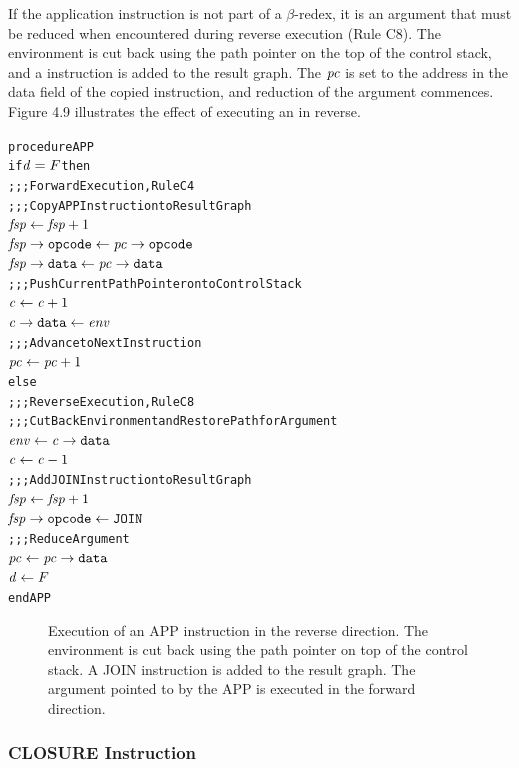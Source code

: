If the application instruction is not part of a \(\beta\)-redex, it is an argument that must be reduced when encountered during reverse execution (Rule C8). The environment is cut back using the path pointer on the top of the control stack, and a  instruction is added to the result graph. The \(\mathit{pc}\) is set to the address in the data field of the copied  instruction, and reduction of the argument commences. Figure 4.9 illustrates the effect of executing an  in reverse.

\par\smallskip\noindent\begin{minipage}{\linewidth}
\begin{alltt}
procedure APP
  if \(\rt{d} = F\) then
    \textrm{;;; Forward Execution, Rule C4}
    \textrm{;;; Copy APP Instruction to Result Graph}
    \(\rt{fsp} \leftarrow \rt{fsp}+1\)
    \(\rtfield{fsp}{opcode} \leftarrow \rtfield{pc}{opcode}\)
    \(\rtfield{fsp}{data} \leftarrow \rtfield{pc}{data}\)
    \textrm{;;; Push Current Path Pointer onto Control Stack}
    \(\rt{c} \leftarrow \rt{c}+1\)
    \(\rtfield{c}{data} \leftarrow \rt{env}\)
    \textrm{;;; Advance to Next Instruction}
    \(\rt{pc} \leftarrow \rt{pc}+1\)
  else
    \textrm{;;; Reverse Execution, Rule C8}
    \textrm{;;; Cut Back Environment and Restore Path for Argument}
    \(\rt{env} \leftarrow \rtfield{c}{data}\)
    \(\rt{c} \leftarrow \rt{c}-1\)
    \textrm{;;; Add JOIN Instruction to Result Graph}
    \(\rt{fsp} \leftarrow \rt{fsp}+1\)
    \(\rtfield{fsp}{opcode} \leftarrow \mathtt{JOIN}\)
    \textrm{;;; Reduce Argument}
    \(\rt{pc} \leftarrow \rtfield{pc}{data}\)
    \(\rt{d} \leftarrow F\)
end APP
\end{alltt}
\end{minipage}\par\smallskip



\begin{figure}[htbp]
\centering

\caption[Reverse APP instruction]{Execution of an APP instruction in the reverse direction. The environment is cut back using the path pointer on top of the control stack. A JOIN instruction is added to the result graph. The argument pointed to by the APP is executed in the forward direction.}
\end{figure}


\subsubsection*{CLOSURE Instruction}

